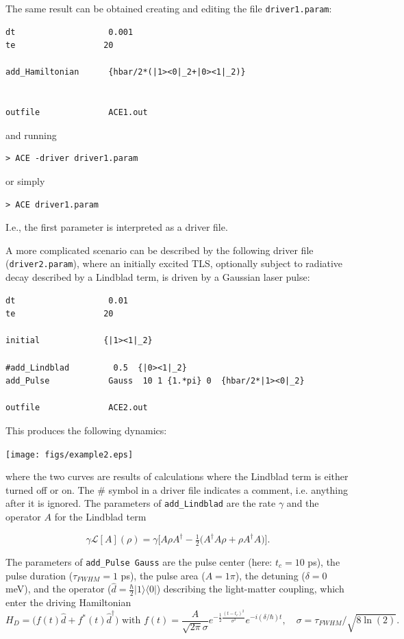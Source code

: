 \documentclass{scrartcl}
\begin{document}
The same result can be obtained creating and editing the file 
\texttt{driver1.param}:


\noindent\makebox[5cm]{\rule{7cm}{0.4pt}}
\begin{verbatim}
dt                   0.001 
te                  20 

add_Hamiltonian      {hbar/2*(|1><0|_2+|0><1|_2)}


outfile              ACE1.out
\end{verbatim}
\noindent\makebox[5cm]{\rule{7cm}{0.4pt}}

and running
\begin{verbatim}
> ACE -driver driver1.param
\end{verbatim}
or simply 
\begin{verbatim}
> ACE driver1.param
\end{verbatim}
I.e., the first parameter is interpreted as a driver file.

A more complicated scenario can be described by the 
following driver file (\verb+driver2.param+), where an initially excited 
TLS, optionally subject to radiative decay described by a 
Lindblad term, is driven by a Gaussian laser pulse:

\noindent\makebox[5cm]{\rule{7cm}{0.4pt}}
\begin{verbatim}
dt                   0.01
te                  20

initial             {|1><1|_2}

#add_Lindblad         0.5  {|0><1|_2}
add_Pulse            Gauss  10 1 {1.*pi} 0  {hbar/2*|1><0|_2}

outfile              ACE2.out
\end{verbatim}
\noindent\makebox[5cm]{\rule{7cm}{0.4pt}}

This produces the following dynamics:

\texttt{[image: figs/example2.eps]}

where the two curves are results of calculations where the Lindblad term is
either turned off or on. The \# symbol in a driver file indicates a comment, 
i.e. anything after it is ignored. The parameters of \texttt{add\_Lindblad}
are the rate $\gamma$ and the operator $A$ for the Lindblad term

\begin{equation}
\gamma \mathcal{L}[A](\rho)=\gamma\bigg[ A\rho A^\dagger 
-\tfrac 12\big(A^\dagger A\rho +\rho A^\dagger A \big)\bigg].
\end{equation}

The parameters of \verb+add_Pulse Gauss+ are the pulse center
(here: $t_c=10$ ps),
the pulse duration ($\tau_{FWHM}=1$ ps), the pulse area ($A=1 \pi$), the
detuning ($\delta=0$ meV), and the operator 
($\hat{d}=\frac{\hbar}{2}|1\rangle\langle 0|$)
describing the light-matter coupling, which enter the driving Hamiltonian
\begin{equation}
H_D=\big(f(t) \hat{d} + f^*(t) \hat{d}^\dagger\big) 
\textrm{ with }
f(t)=\frac{A}{\sqrt{2\pi}\sigma} e^{-\frac 12 \frac{(t-t_c)^2}{\sigma^2}}
e^{-i (\delta/\hbar) t},
\quad \sigma=\tau_{FWHM}/\sqrt{8 \ln(2)}.
\end{equation}
\vspace{1cm}
\end{document}
